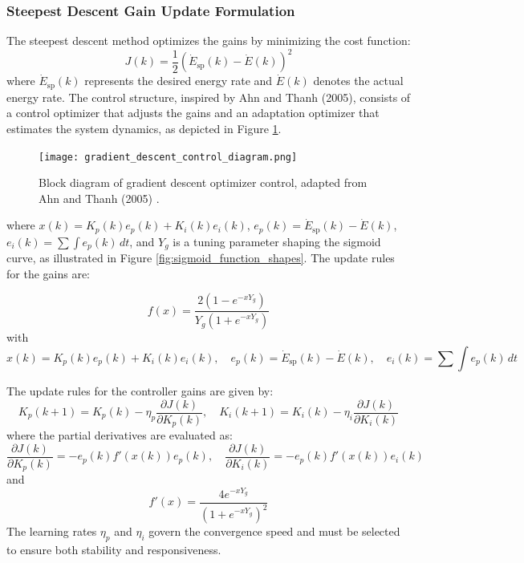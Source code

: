 \documentclass[journal,article,submit,pdftex,moreauthors]{Definitions/mdpi}
\begin{document}
\subsubsection{Steepest Descent Gain Update Formulation}
The steepest descent method optimizes the gains by minimizing the cost function:
\begin{equation}
    J(k) = \frac{1}{2}(\dot{E}_{\text{sp}}(k) - \dot{E}(k))^2
\end{equation}
where \(\dot{E}_{\text{sp}}(k)\) represents the desired energy rate and \(\dot{E}(k)\) denotes the actual energy rate. The control structure, inspired by Ahn and Thanh (2005), consists of a control optimizer that adjusts the gains and an adaptation optimizer that estimates the system dynamics, as depicted in Figure \ref{fig:gradient_descent_control_diagram}.

\begin{figure}[H]
    \centering
    \texttt{[image: gradient\_descent\_control\_diagram.png]}
    \caption{Block diagram of gradient descent optimizer control, adapted from Ahn and Thanh (2005) \cite{Ahn2005}.}
    \label{fig:gradient_descent_control_diagram}
\end{figure}

where \(x(k) = K_p(k)e_p(k) + K_i(k)e_i(k)\), \(e_p(k) = \dot{E}_{\text{sp}}(k) - \dot{E}(k)\), \(e_i(k) = \sum \int e_p(k) \, dt\), and \(Y_g\) is a tuning parameter shaping the sigmoid curve, as illustrated in Figure \ref{fig:sigmoid_function_shapes}. The update rules for the gains are:

\begin{equation}
    f(x) = \frac{2(1 - e^{-x Y_g})}{Y_g (1 + e^{-x Y_g})}
\end{equation}
with
\begin{equation}
    x(k) = K_p(k) e_p(k) + K_i(k) e_i(k), \quad e_p(k) = \dot{E}_{\text{sp}}(k) - \dot{E}(k), \quad e_i(k) = \sum \int e_p(k) \, dt
\end{equation}

The update rules for the controller gains are given by:
\begin{equation}
    K_p(k+1) = K_p(k) - \eta_p \frac{\partial J(k)}{\partial K_p(k)}, \quad K_i(k+1) = K_i(k) - \eta_i \frac{\partial J(k)}{\partial K_i(k)}
\end{equation}
where the partial derivatives are evaluated as:
\begin{equation}
    \frac{\partial J(k)}{\partial K_p(k)} = -e_p(k) f'(x(k)) e_p(k), \quad \frac{\partial J(k)}{\partial K_i(k)} = -e_p(k) f'(x(k)) e_i(k)
\end{equation}
and
\begin{equation}
    f'(x) = \frac{4e^{-x Y_g}}{(1 + e^{-x Y_g})^2}
\end{equation}
The learning rates $\eta_p$ and $\eta_i$ govern the convergence speed and must be selected to ensure both stability and responsiveness.
\end{document}
